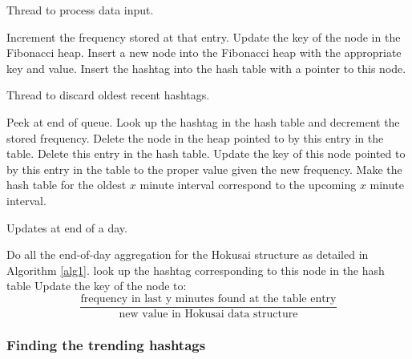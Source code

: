 \documentclass[a4paper,12pt]{article}
\begin{document}
\begin{algorithm}
\caption{Thread to process data input.}
\begin{algorithmic}[1]
		\State Increment the frequency stored at that entry.
		\State Update the key of the node in the Fibonacci heap.
	\Else
		\State Insert a new node into the Fibonacci heap with the appropriate key and value. 
		\State Insert the hashtag into the hash table with a pointer to this node.
 	\EndIf
\EndWhile
\end{algorithmic}
\end{algorithm}


\begin{algorithm}
\caption{Thread to discard oldest recent hashtags.}
\begin{algorithmic}[1]
\Loop
		\State Peek at end of queue.
			\State Look up the hashtag in the hash table and decrement the stored frequency.
				\State Delete the node in the heap pointed to by this entry in the table.
				\State Delete this entry in the hash table.
			\Else	
				\State Update the key of this node pointed to by this entry in the table to the proper value given the new frequency.
			\EndIf
		\EndIf
	\EndIf
\EndLoop
\State Make the hash table for the oldest $x$ minute interval correspond to the upcoming $x$ minute interval.

\end{algorithmic}
\end{algorithm}



\begin{algorithm}
\caption{Updates at end of a day.}
\begin{algorithmic}[1]
\State Do all the end-of-day aggregation for the Hokusai structure as detailed in Algorithm \ref{alg1}.
	\State look up the hashtag corresponding to this node in the hash table
	\State Update the key of the node to: \[\frac{\text{frequency in last y minutes found at the table entry}}{\text{new value in Hokusai data structure}}\]
\EndFor
\end{algorithmic}
\end{algorithm}

\subsubsection{Finding the trending hashtags}
\end{document}
